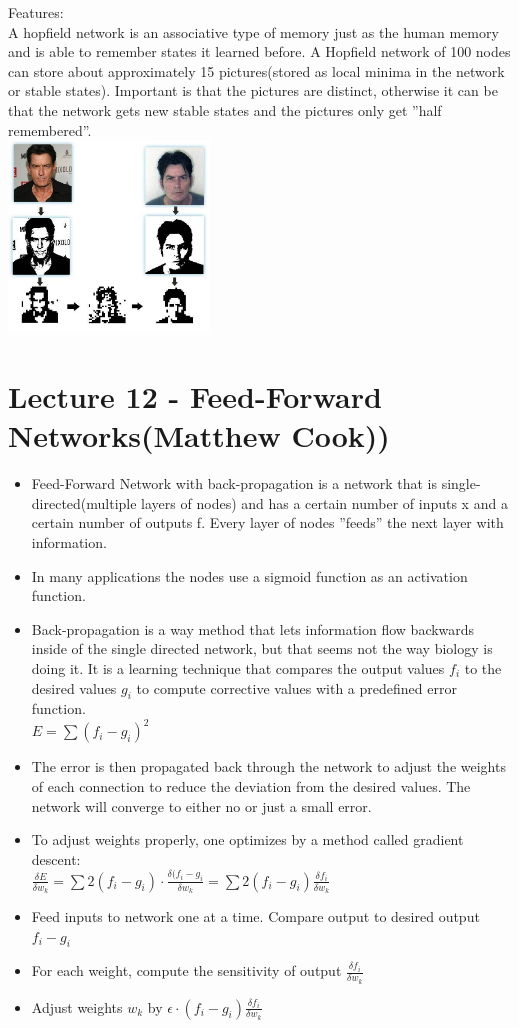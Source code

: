\documentclass[english,11pt]{article}
\begin{document}
Features:\\
A hopfield network is an associative type of memory just as the human memory and is able to remember states it learned before. A Hopfield network of 100 nodes can store about approximately 15 pictures(stored as local minima in the network or stable states). Important is that the pictures are distinct, otherwise it can be that the network gets new stable states and the pictures only get ''half remembered''.\\
\includegraphics[width=0.4\textwidth]{hopfield-network-face-recog.png}

\section{Lecture 12 - Feed-Forward Networks(Matthew Cook))}
\begin{itemize}
\item Feed-Forward Network with back-propagation is a network that is single-directed(multiple layers of nodes) and has a certain number of inputs x and a certain number of outputs f. Every layer of nodes ''feeds'' the next layer with information.
\item In many applications the nodes use a sigmoid function as an activation function.
\item Back-propagation is a way method that lets information flow backwards inside of the single directed network, but that seems not the way biology is doing it. It is a learning technique that compares the output values $f_i$ to the desired values $g_i$ to compute corrective values with a predefined error function.\\
$E = \sum (f_i -g_i)^2$

\item The error is then propagated back through the network to adjust the weights of each connection to reduce the deviation from the desired values. The network will converge to either no or just a small error.
\item To adjust weights properly, one optimizes by a method called gradient descent:\\
$\frac{\delta E}{\delta w_k} = \sum 2(f_i - g_i) \cdot \frac{\delta(f_i - g_i}{\delta w_k} = \sum 2(f_i - g_i) \frac{\delta f_i}{\delta w_k}$
\item Feed inputs to network one at a time. Compare output to desired output $f_i - g_i$
\item For each weight, compute the sensitivity of output $\frac{\delta f_i}{\delta w_k}$
\item Adjust weights $w_k$ by $\epsilon \cdot (f_i - g_i) \frac{\delta f_i}{\delta w_k}$


\end{itemize}
\end{document}
